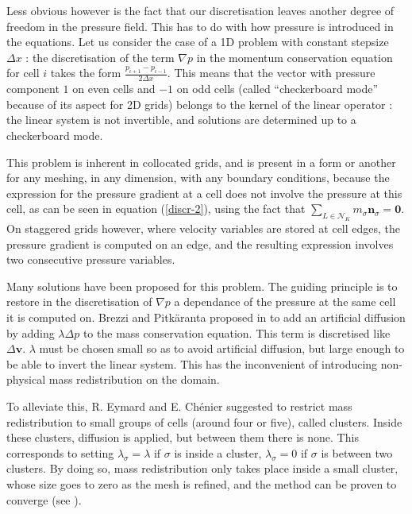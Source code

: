 \documentclass[12pt]{article}
\newcommand{\vb}[1]{\ensuremath{\boldsymbol #1}}
\begin{document}
Less obvious however is the fact that our discretisation leaves
another degree of freedom in the pressure field. This has to do with
how pressure is introduced in the equations. Let us consider the case
of a 1D problem with constant stepsize $\Delta x$ : the discretisation
of the term $\nabla p$ in the momentum conservation equation for cell
$i$ takes the form $\frac{p_{i+1} - p_{i-1}}{2 \Delta x}$. This means
that the vector with pressure component $1$ on even cells and $-1$ on
odd cells (called ``checkerboard mode'' because of its aspect for 2D
grids) belongs to the kernel of the linear operator : the linear
system is not invertible, and solutions are determined up to a
checkerboard mode.

This problem is inherent in collocated grids, and is present in a form
or another for any meshing, in any dimension, with any boundary
conditions, because the expression for the pressure gradient at a cell
does not involve the pressure at this cell, as can be seen in equation
(\ref{discr-2}), using the fact that $\sum_{L \in \mathcal N _{K}}
m_\sigma \vb{n}_\sigma = \vb{0}$. On staggered grids however, where
velocity variables are stored at cell edges, the pressure gradient is
computed on an edge, and the resulting expression involves two
consecutive pressure variables.

Many solutions have been proposed for this problem. The guiding
principle is to restore in the discretisation of $\nabla p$ a
dependance of the pressure at the same cell it is computed on. Brezzi
and Pitk{\"a}ranta proposed in \cite{brezzip} to add an artificial
diffusion by adding $\lambda \Delta p$ to the mass conservation
equation. This term is discretised like $\Delta \vb{v}$. $\lambda$
must be chosen small so as to avoid artificial diffusion, but large
enough to be able to invert the linear system. This has the
inconvenient of introducing non-physical mass redistribution on the
domain.

To alleviate this, R. Eymard and E. Ch\'enier \cite{che-06-num}
suggested to restrict mass redistribution to small groups of cells
(around four or five), called clusters. Inside these clusters,
diffusion is applied, but between them there is none. This corresponds
to setting $\lambda_\sigma = \lambda$ if $\sigma$ is inside a cluster,
$\lambda_\sigma = 0$ if $\sigma$ is between two clusters. By doing so,
mass redistribution only takes place inside a small cluster, whose size
goes to zero as the mesh is refined, and the method can be proven to
converge (see \cite{eym-07-sta}).
\end{document}
